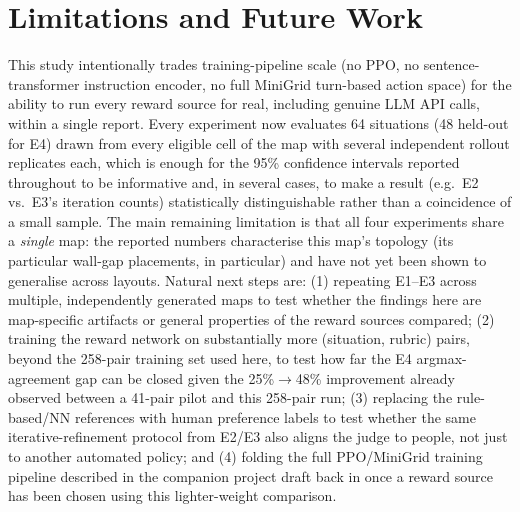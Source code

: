 \documentclass[10pt,conference]{IEEEtran}
\begin{document}
\section{Limitations and Future Work}
\label{sec:limitations}
This study intentionally trades training-pipeline scale (no PPO,
no sentence-transformer instruction encoder, no full MiniGrid turn-based
action space) for the ability to run every reward source for real,
including genuine LLM API calls, within a single report. Every
experiment now evaluates 64 situations (48 held-out for E4) drawn from
every eligible cell of the map with several independent rollout
replicates each, which is enough for the 95\% confidence intervals
reported throughout to be informative and, in several cases, to make a
result (e.g.\ E2 vs.\ E3's iteration counts) statistically distinguishable
rather than a coincidence of a small sample. The main remaining
limitation is that all four experiments share a \emph{single} map:
the reported numbers characterise this map's topology (its particular
wall-gap placements, in particular) and have not yet been shown to
generalise across layouts. Natural next steps are: (1) repeating E1--E3
across multiple, independently generated maps to test whether the
findings here are map-specific artifacts or general properties of the
reward sources compared; (2) training the reward network on substantially
more (situation, rubric) pairs, beyond the 258-pair training set used
here, to test how far the E4 argmax-agreement gap can be closed given
the 25\%$\to$48\% improvement already observed between a 41-pair pilot
and this 258-pair run; (3) replacing the rule-based/NN
references with human preference labels to test whether the same
iterative-refinement protocol from E2/E3 also aligns the judge to
people, not just to another automated policy; and (4) folding the full
PPO/MiniGrid training pipeline described in the companion project draft
back in once a reward source has been chosen using this lighter-weight
comparison.



\end{document}
